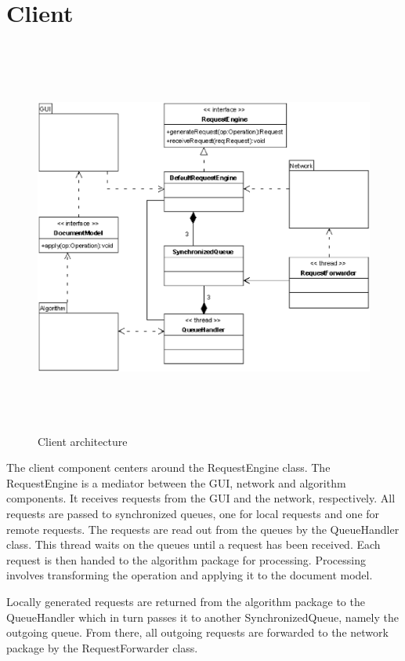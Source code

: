 \section{Client}
\begin{figure}[H]
\centering
\includegraphics[height=13.04cm,width=15.46cm]{../../images/algo-impl/client_diagram.eps}
\caption{Client architecture}
\label{Client architecture}
\end{figure}

The client component centers around the RequestEngine class. The RequestEngine is a mediator between the GUI, network and algorithm components. It receives requests from the GUI and the network, respectively. All requests are passed to synchronized queues, one for local requests and one for remote requests. The requests are read out from the queues by the QueueHandler class. This thread waits on the queues until a request has been received. Each request is then handed to the algorithm package for processing. Processing involves transforming the operation and applying it to the document model. 

Locally generated requests are returned from the algorithm package  to the QueueHandler which in turn passes it to another SynchronizedQueue, namely the outgoing queue. From there, all outgoing requests are forwarded to the network package by the RequestForwarder class. 


